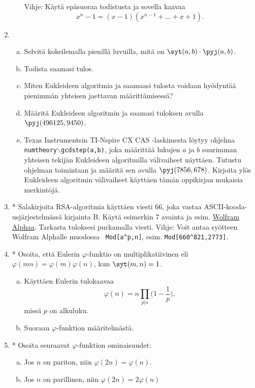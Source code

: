 \begin{enumerate}
\begin{enumerate}[a)]
Vihje: Käytä epäsuoraa todistusta ja sovella kaavaa
\[
x^n-1 = (x-1)(x^{n-1}+\ldots+x+1).
\]
\end{enumerate}

\item
\begin{enumerate}[a)]
\item Selvitä kokeilemalla pienillä luvuilla, mitä on
$\syt(a, b)\cdot \pyj(a, b)$.
\item Todista saamasi tulos.
\item Miten Eukleideen algoritmia ja saamaasi tulosta voidaan
hyödyntää pienimmän yhteisen jaettavan määrittämisessä?
\item Määritä Eukleideen algoritmin ja saamasi tuloksen
avulla\\ $\pyj(496125, 9450)$.
\item Texas Instrumentsin TI-Nspire CX CAS -laskimesta löytyy
ohjelma \\{\tt numtheory$\backslash$gcdstep(a,b)}, joka määrittää
lukujen $a$ ja $b$ suurimman yhteisen tekijän Eukleideen
algoritmilla välivaiheet näyttäen. Tutustu ohjelman toimintaan ja
määritä sen avulla $\pyj(7856, 678)$. Kirjoita ylös Eukleideen
algoritmin välivaiheet käyttäen tämän oppikirjan mukaisia
merkintöjä.
\end{enumerate}

\item * %
Salakirjoita RSA-algoritmia käyttäen
viesti $66$, joka vastaa ASCII-kooda-\\usjärjestelmässä kirjainta
B. Käytä esimerkin 7 avainta ja esim. \href{http://
www.wolframalpha.com}{Wolfram Alphaa}. Tarkasta tuloksesi
purkamalla viesti.
Vihje: Voit antaa syötteen Wolfram Alphalle muodossa {\tt
Mod[a\^{}p,n]}, esim. {\tt Mod[660\^{}821,2773]}.


\item * %
Osoita, että Eulerin $\varphi$-funktio on multiplikatiivinen
eli $\varphi(mn) = \varphi(m) \varphi(n)$, kun $\syt(m, n)=1$.
\begin{enumerate}[a)]
\item Käyttäen Eulerin tulokaavaa
\[
\varphi(n)=n \prod_{p|n} \bigg(1-\frac{1}{p}\bigg),
\]
missä $p$ on alkuluku. 
\item
Suoraan $\varphi$-funktion määritelmästä.
\end{enumerate}

\item *  Osoita seuraavat $\varphi$-funktion ominaisuudet:
\begin{enumerate}[a)]
\item
Jos $n$ on pariton, niin $\varphi(2n)=\varphi(n)$.
\item
Jos $n$ on parillinen, niin $\varphi(2n)=2\varphi(n)$
\end{enumerate}


\end{enumerate}
